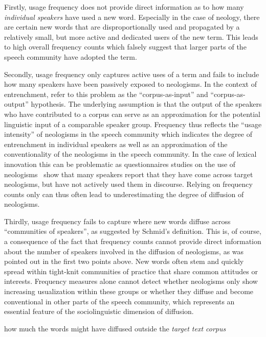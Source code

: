 \documentclass[draft, a4paper, abstract=on]{scrartcl}
\begin{document}
  Firstly, usage frequency does not provide direct information as to how many \emph{individual speakers} have used a new word. Especially in the case of neology, there are certain new words that are disproportionally used and propagated by a relatively small, but more active and dedicated users of the new term. This leads to high overall frequency counts which falsely suggest that larger parts of the speech community have adopted the term.

  Secondly, usage frequency only captures active uses of a term and fails to include how many speakers have been passively exposed to neologisms. In the context of entrenchment, \textcite{Stefanowitsch2017CorpusbasedPerspective} refer to this problem as the \enquote{corpus-as-input} and \enquote{corpus-as-output} hypothesis. The underlying assumption is that the output of the speakers who have contributed to a corpus can serve as an approximation for the potential linguistic input of a comparable speaker group. Frequency thus reflects the \enquote{usage intensity} of neologisms in the speech community which indicates the degree of entrenchment in individual speakers as well as an approximation of the conventionality of the neologisms in the speech community. In the case of lexical innovation this can be problematic as questionnaires studies on the use of neologisms~\parencite{Kerremans2015WebNew} show that many speakers report that they have come across target neologisms, but have not actively used them in discourse. Relying on frequency counts only can thus often lead to underestimating the degree of diffusion of neologisms.

  Thirdly, usage frequency fails to capture where new words diffuse across \enquote{communities of speakers}, as suggested by Schmid's definition. This is, of course, a consequence of the fact that frequency counts cannot provide direct information about the number of speakers involved in the diffusion of neologisms, as was pointed out in the first two points above. New words often stem and quickly spread within tight-knit communities of practice that share common attitudes or interests. Frequency measures alone cannot detect whether neologisms only show increasing usualization within these groups or whether they diffuse and become conventional in other parts of the speech community, which represents an essential feature of the sociolinguistic dimension of diffusion.


  how much the words might have diffused outside the \emph{target text corpus}
\end{document}

